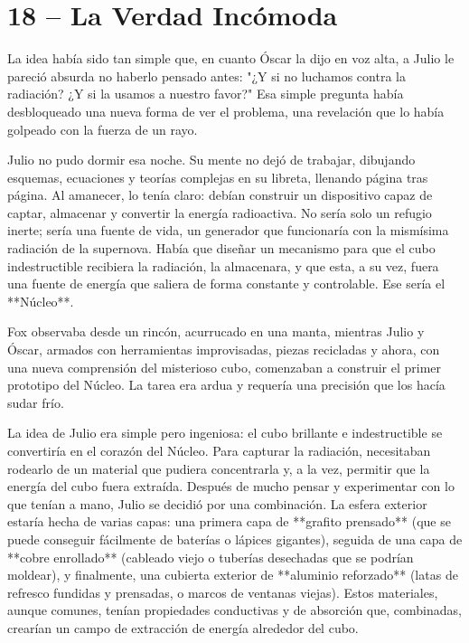 \documentclass[a4paper,12pt]{book}
\begin{document}
\cleardoublepage %

\chapter*{18 – La Verdad Incómoda}

La idea había sido tan simple que, en cuanto Óscar la dijo en voz alta, a Julio le pareció absurda no haberlo pensado antes: "¿Y si no luchamos contra la radiación? ¿Y si la usamos a nuestro favor?" Esa simple pregunta había desbloqueado una nueva forma de ver el problema, una revelación que lo había golpeado con la fuerza de un rayo.

Julio no pudo dormir esa noche. Su mente no dejó de trabajar, dibujando esquemas, ecuaciones y teorías complejas en su libreta, llenando página tras página. Al amanecer, lo tenía claro: debían construir un dispositivo capaz de captar, almacenar y convertir la energía radioactiva. No sería solo un refugio inerte; sería una fuente de vida, un generador que funcionaría con la mismísima radiación de la supernova. Había que diseñar un mecanismo para que el cubo indestructible recibiera la radiación, la almacenara, y que esta, a su vez, fuera una fuente de energía que saliera de forma constante y controlable. Ese sería el **Núcleo**.

Fox observaba desde un rincón, acurrucado en una manta, mientras Julio y Óscar, armados con herramientas improvisadas, piezas recicladas y ahora, con una nueva comprensión del misterioso cubo, comenzaban a construir el primer prototipo del Núcleo. La tarea era ardua y requería una precisión que los hacía sudar frío.

La idea de Julio era simple pero ingeniosa: el cubo brillante e indestructible se convertiría en el corazón del Núcleo. Para capturar la radiación, necesitaban rodearlo de un material que pudiera concentrarla y, a la vez, permitir que la energía del cubo fuera extraída. Después de mucho pensar y experimentar con lo que tenían a mano, Julio se decidió por una combinación. La esfera exterior estaría hecha de varias capas: una primera capa de **grafito prensado** (que se puede conseguir fácilmente de baterías o lápices gigantes), seguida de una capa de **cobre enrollado** (cableado viejo o tuberías desechadas que se podrían moldear), y finalmente, una cubierta exterior de **aluminio reforzado** (latas de refresco fundidas y prensadas, o marcos de ventanas viejas). Estos materiales, aunque comunes, tenían propiedades conductivas y de absorción que, combinadas, crearían un campo de extracción de energía alrededor del cubo.
\end{document}
